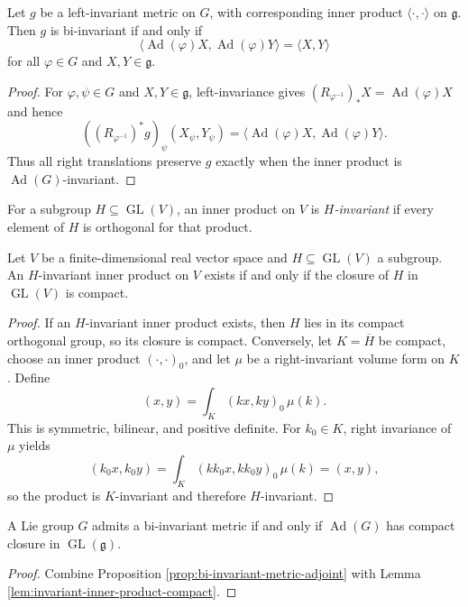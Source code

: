 \begin{proposition}
\label{prop:bi-invariant-metric-adjoint}
Let $g$ be a left-invariant metric on $G$, with corresponding inner product
$\langle\cdot,\cdot\rangle$ on $\mathfrak g$. Then $g$ is bi-invariant if and
only if
\[
\langle\operatorname{Ad}(\varphi)X,\operatorname{Ad}(\varphi)Y\rangle
=\langle X,Y\rangle
\]
for all $\varphi\in G$ and $X,Y\in\mathfrak g$.
\end{proposition}
\begin{proof}
\sketch For $\varphi,\psi\in G$ and $X,Y\in\mathfrak g$, left-invariance gives
$(R_{\varphi^{-1}})_*X=\operatorname{Ad}(\varphi)X$ and hence
\[
((R_{\varphi^{-1}})^*g)_\psi(X_\psi,Y_\psi)
=\langle\operatorname{Ad}(\varphi)X,
\operatorname{Ad}(\varphi)Y\rangle.
\]
Thus all right translations preserve $g$ exactly when the inner product is
$\operatorname{Ad}(G)$-invariant.
\end{proof}

For a subgroup $H\subseteq\operatorname{GL}(V)$, an inner product on $V$ is
\emph{$H$-invariant} if every element of $H$ is orthogonal for that product.

\begin{lemma}
\label{lem:invariant-inner-product-compact}
Let $V$ be a finite-dimensional real vector space and
$H\subseteq\operatorname{GL}(V)$ a subgroup. An $H$-invariant inner product on
$V$ exists if and only if the closure of $H$ in $\operatorname{GL}(V)$ is
compact.
\end{lemma}
\begin{proof}
\sketch If an $H$-invariant inner product exists, then $H$ lies in its compact
orthogonal group, so its closure is compact. Conversely, let $K=\overline H$ be
compact, choose an inner product $(\cdot,\cdot)_0$, and let $\mu$ be a
right-invariant volume form on $K$. Define
\[
(x,y)=\int_K(kx,ky)_0\,\mu(k).
\]
This is symmetric, bilinear, and positive definite. For $k_0\in K$, right
invariance of $\mu$ yields
\[
(k_0x,k_0y)=\int_K(kk_0x,kk_0y)_0\,\mu(k)=(x,y),
\]
so the product is $K$-invariant and therefore $H$-invariant.
\end{proof}

\begin{theorem}
\label{thm:existence-bi-invariant-metrics}
A Lie group $G$ admits a bi-invariant metric if and only if
$\operatorname{Ad}(G)$ has compact closure in
$\operatorname{GL}(\mathfrak g)$.
\end{theorem}
\begin{proof}
\sketch Combine Proposition \ref{prop:bi-invariant-metric-adjoint} with Lemma
\ref{lem:invariant-inner-product-compact}.
\end{proof}

